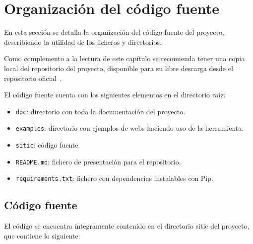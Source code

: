 
\section{Organización del código fuente}

En esta sección se detalla la organización del código fuente del proyecto,
describiendo la utilidad de los ficheros y directorios.

Como complemento a la lectura de este capítulo se recomienda tener una copia
local del repositorio del proyecto, disponible para su libre descarga desde
el repositorio oficial~\cite{repositorio}.

El código fuente cuenta con los siguientes elementos en el directorio raíz:

\begin{itemize}
    \item \texttt{doc}: directorio con toda la documentación del proyecto.
    \item \texttt{examples}: directorio con ejemplos de webs haciendo uso de la herramienta.
    \item \texttt{sitic}: código fuente.
    \item \texttt{README.md}: fichero de presentación para el repositorio.
    \item \texttt{requirements.txt}: fichero con dependencias instalables con Pip.
\end{itemize}

\subsection{Código fuente}

El código se encuentra íntegramente contenido en el directorio sitic del proyecto, que contiene lo siguiente:

